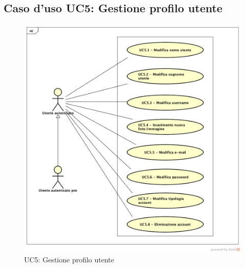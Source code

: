 \subsection{Caso d'uso UC5: Gestione profilo utente}

\label{UC5}
\begin{figure}[h]
	\centering
	\includegraphics[scale=0.5,keepaspectratio]{UML/UC5.png}
	\caption{UC5: Gestione profilo utente}
\end{figure}
\FloatBarrier
